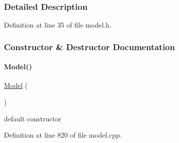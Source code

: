 \subsubsection{Detailed Description}


Definition at line 35 of file model.\+h.



\subsubsection{Constructor \& Destructor Documentation}
\mbox{\label{classamici_1_1_model_a30c57abda5ed227c85b50007cee876db}} 
\paragraph{\texorpdfstring{Model()}{Model()}\hspace{0.1cm}{\footnotesize\ttfamily [1/2]}}
{\footnotesize\ttfamily \mbox{\hyperlink{classamici_1_1_model}{Model}} (\begin{DoxyParamCaption}{ }\end{DoxyParamCaption})}

default constructor 

Definition at line 820 of file model.\+cpp.

\mbox{\label{classamici_1_1_model_abd567a1612a8b947ca43c74df3b83273}} 
